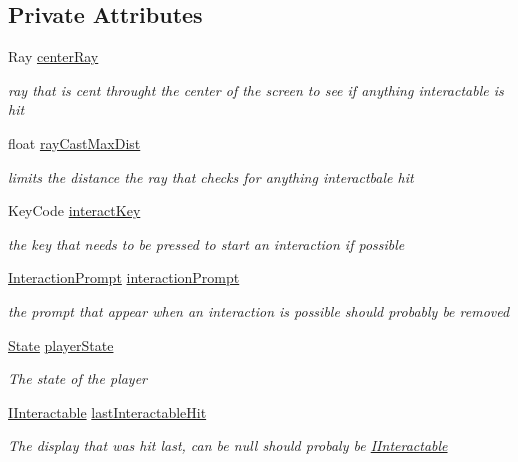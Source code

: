 \subsection*{Private Attributes}
\begin{DoxyCompactItemize}
\item 
Ray \mbox{\hyperlink{class_player_ae2a4edadae1e278ef28c3bb236e7af83}{center\+Ray}}
\begin{DoxyCompactList}\small\item\em ray that is cent throught the center of the screen to see if anything interactable is hit \end{DoxyCompactList}\item 
float \mbox{\hyperlink{class_player_a322b20647ba7b9c279006c4745f7eae9}{ray\+Cast\+Max\+Dist}}
\begin{DoxyCompactList}\small\item\em limits the distance the ray that checks for anything interactbale hit \end{DoxyCompactList}\item 
Key\+Code \mbox{\hyperlink{class_player_ad17e0e6b44972e1c99a08fbaa38b0672}{interact\+Key}}
\begin{DoxyCompactList}\small\item\em the key that needs to be pressed to start an interaction if possible \end{DoxyCompactList}\item 
\mbox{\hyperlink{class_interaction_prompt}{Interaction\+Prompt}} \mbox{\hyperlink{class_player_aa1545460a9996f71150823c51dc60ab5}{interaction\+Prompt}}
\begin{DoxyCompactList}\small\item\em the prompt that appear when an interaction is possible should probably be removed \end{DoxyCompactList}\item 
\mbox{\hyperlink{class_player_aa3b6104791d642173caf761cf81f8c08}{State}} \mbox{\hyperlink{class_player_a8b94069330ce05b42769d5cc61c6f00a}{player\+State}}
\begin{DoxyCompactList}\small\item\em The state of the player \end{DoxyCompactList}\item 
\mbox{\hyperlink{interface_i_interactable}{I\+Interactable}} \mbox{\hyperlink{class_player_ac05f1557fc411c88274df512abb865ac}{last\+Interactable\+Hit}}
\begin{DoxyCompactList}\small\item\em The display that was hit last, can be null should probaly be \mbox{\hyperlink{interface_i_interactable}{I\+Interactable}} \end{DoxyCompactList}\end{DoxyCompactItemize}


